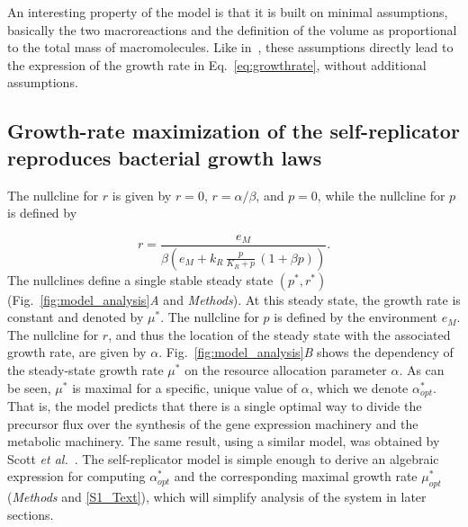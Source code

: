 An interesting property of the model is that it is built on minimal assumptions, basically the two macroreactions and the definition of the volume as proportional to the total mass of macromolecules.
Like in~\cite{molenaar_shifts_2009,pavlov_optimal_2013,scott_emergence_2014}, these assumptions directly lead to the expression of the growth rate in Eq.~\ref{eq:growthrate}, without additional assumptions.

\subsection{Growth-rate maximization of the self-replicator reproduces bacterial growth laws}
\label{sec:growthlaws}

The nullcline for $r$ is given by $r=0$, $r=\alpha/\beta$, and $p=0$, while the nullcline for $p$ is defined by

\[
r = \frac{e_M}{\beta \left(e_M + k_R\, \frac{p}{K_R+p}\, (1+\beta p)\right)}.
\]
The nullclines define a single stable steady state $(p^*, r^*)$ (Fig.~\ref{fig:model_analysis}\textit{A} and \textit{Methods}).
At this steady state, the growth rate is constant and denoted by $\mu^*$.
The nullcline for $p$ is defined by the environment $e_M$.
The nullcline for $r$, and thus the location of the steady state with the associated growth rate, are given by $\alpha$.
Fig.~\ref{fig:model_analysis}\textit{B} shows the dependency of the steady-state growth rate $\mu^*$ on the resource allocation parameter $\alpha$.
As can be seen, $\mu^*$ is maximal for a specific, unique value of $\alpha$, which we denote $\alpha_{opt}^*$.
That is, the model predicts that there is a single optimal way to divide the precursor flux over the synthesis of the gene expression machinery and the metabolic machinery.
The same result, using a similar model, was obtained by Scott \textit{et al.}~\cite{scott_emergence_2014}.
The self-replicator model is simple enough to derive an algebraic expression for computing $\alpha^*_{opt}$ and the corresponding maximal growth rate $\mu^*_{opt}$ (\textit{Methods} and \ref{S1_Text}), which will simplify analysis of the system in later sections.

